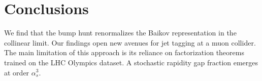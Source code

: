 \section{Conclusions}\label{sec:conclusions}

We find that the bump hunt renormalizes the Baikov representation in the
collinear limit. Our findings open new avenues for jet tagging at a muon
collider. The main limitation of this approach is its reliance on
factorization theorems trained on the LHC Olympics dataset. A stochastic
rapidity gap fraction emerges at order $\alpha_s^3$.

